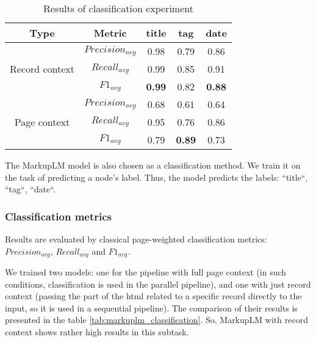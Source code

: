 \begin{table}[htbp]
\centering
\caption{Results of classification experiment}
\begin{tabular}{c|c|*3c}
    \toprule
        Type                                    &     Metric            & title    & tag      &  date \\
        
        \midrule
\multirow{3}{*}{Record context}                & $Precision_{avg}$     & 0.98     & 0.79     & 0.86  \\
                                                & $Recall_{avg}$        & 0.99     & 0.85     & 0.91  \\
                                                & $F\textit{1}_{avg}$   & \textbf{0.99}     & 0.82      & \textbf{0.88}  \\
        
        \midrule
\multirow{3}{*}{Page context}                   & $Precision_{avg}$     & 0.68     & 0.61       & 0.64      \\
                                                & $Recall_{avg}$        & 0.95     & 0.76       & 0.86      \\
                                                & $F\textit{1}_{avg}$   &  0.79    & \textbf{0.89}       & 0.73      \\
    \bottomrule
\end{tabular}
\label{tab:markuplm_classification}
\end{table}

The MarkupLM model is also chosen as a classification method. We train it on the task of predicting a node’s label. Thus, the model predicts the labels: ``title``, ``tag``, ``date``. 


\subsubsection*{Classification metrics}
Results are evaluated by classical page-weighted classification metrics: $Precision_{avg}$, $Recall_{avg}$ and $F\textit{1}_{avg}$.

We trained two models: one for the pipeline with full page context (in such conditions, classification is used in the parallel pipeline), and one with just record context (passing the part of the html related to a specific record directly to the input, so it is used in a sequential pipeline). The comparison of their results is presented in the table \autoref{tab:markuplm_classification}. So, MarkupLM with record context shows rather high results in this subtask.

